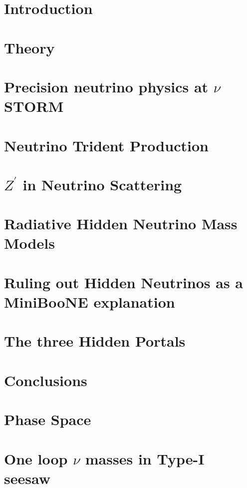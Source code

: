 \documentclass[twoside,openright,frontopenright]{ip3thesis}
\begin{document}
\chapter{Introduction}


\chapter{Theory}
%

\chapter{Precision neutrino physics at $\nu$STORM}
%

\chapter{Neutrino Trident Production}
%

\chapter{$Z^\prime$ in Neutrino Scattering}
%

\chapter{Radiative Hidden Neutrino Mass Models}
%

\chapter{Ruling out Hidden Neutrinos as a MiniBooNE explanation}
%

\chapter{The three Hidden Portals}
%

\chapter{Conclusions}
%

\appendix
\chapter{Phase Space}

\chapter{One loop $\nu$ masses in Type-I seesaw}




\end{document}
